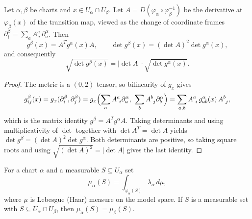 \begin{lemma}
\label{lem:volume-density-change}





Let $\alpha,\beta$ be charts and $x\in U_\alpha\cap U_\beta$. Let
$A=D(\varphi_\alpha\circ\varphi_\beta^{-1})$ be the derivative at $\varphi_\beta(x)$ of the
transition map, viewed as the change of coordinate frames
$\partial^\beta_i=\sum_a A^a_{\ i}\,\partial^\alpha_a$. Then
$$g^\beta(x)=A^{T}g^\alpha(x)A,\qquad
\det g^\beta(x)=(\det A)^2\det g^\alpha(x),$$
and consequently
$$\sqrt{\det g^\beta(x)}=\lvert\det A\rvert\cdot\sqrt{\det g^\alpha(x)}.$$
\end{lemma}

\begin{proof}
\sketch
{}

The metric is a $(0,2)$-tensor, so bilinearity of $g_x$ gives
$$g^\beta_{ij}(x)=g_x(\partial^\beta_i,\partial^\beta_j)
=g_x\Bigl(\sum_a A^a_{\ i}\partial^\alpha_a,\ \sum_b A^b_{\ j}\partial^\alpha_b\Bigr)
=\sum_{a,b}A^a_{\ i}\,g^\alpha_{ab}(x)\,A^b_{\ j},$$
which is the matrix identity $g^\beta=A^{T}g^\alpha A$. Taking determinants and using
multiplicativity of $\det$ together with $\det A^{T}=\det A$ yields
$\det g^\beta=(\det A)^2\det g^\alpha$. Both determinants are positive, so taking square
roots and using $\sqrt{(\det A)^2}=\lvert\det A\rvert$ gives the last identity.
\end{proof}

\begin{lemma}
\label{lem:riemannian-measure-well-defined}





For a chart $\alpha$ and a measurable $S\subseteq U_\alpha$ set
$$\mu_\alpha(S)=\int_{\varphi_\alpha(S)}\lambda_\alpha\,d\mu ,$$
where $\mu$ is Lebesgue (Haar) measure on the model space. If $S$ is a measurable set with
$S\subseteq U_\alpha\cap U_\beta$, then $\mu_\alpha(S)=\mu_\beta(S)$.
\end{lemma}

